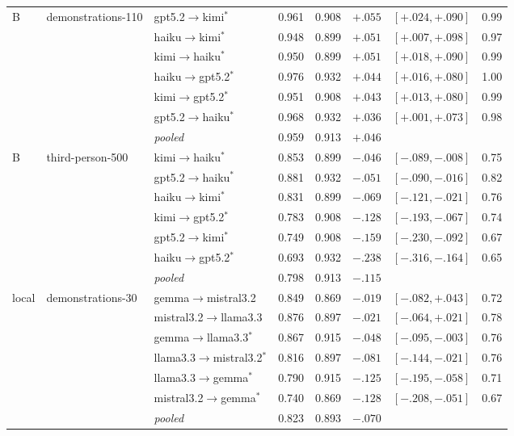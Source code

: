 {\begin{longtable}{lllrlrrr}
\addlinespace
B & demonstrations-110 & gpt5.2$\to$kimi$^{*}$ & 0.961 & 0.908 & $+.055$ & $[+.024,+.090]$ & 0.99 \\*
 &  & haiku$\to$kimi$^{*}$ & 0.948 & 0.899 & $+.051$ & $[+.007,+.098]$ & 0.97 \\*
 &  & kimi$\to$haiku$^{*}$ & 0.950 & 0.899 & $+.051$ & $[+.018,+.090]$ & 0.99 \\*
 &  & haiku$\to$gpt5.2$^{*}$ & 0.976 & 0.932 & $+.044$ & $[+.016,+.080]$ & 1.00 \\*
 &  & kimi$\to$gpt5.2$^{*}$ & 0.951 & 0.908 & $+.043$ & $[+.013,+.080]$ & 0.99 \\*
 &  & gpt5.2$\to$haiku$^{*}$ & 0.968 & 0.932 & $+.036$ & $[+.001,+.073]$ & 0.98 \\*
 & & \emph{pooled} & 0.959 & 0.913 & $+.046$ & & \\
\addlinespace
B & third-person-500 & kimi$\to$haiku$^{*}$ & 0.853 & 0.899 & $-.046$ & $[-.089,-.008]$ & 0.75 \\*
 &  & gpt5.2$\to$haiku$^{*}$ & 0.881 & 0.932 & $-.051$ & $[-.090,-.016]$ & 0.82 \\*
 &  & haiku$\to$kimi$^{*}$ & 0.831 & 0.899 & $-.069$ & $[-.121,-.021]$ & 0.76 \\*
 &  & kimi$\to$gpt5.2$^{*}$ & 0.783 & 0.908 & $-.128$ & $[-.193,-.067]$ & 0.74 \\*
 &  & gpt5.2$\to$kimi$^{*}$ & 0.749 & 0.908 & $-.159$ & $[-.230,-.092]$ & 0.67 \\*
 &  & haiku$\to$gpt5.2$^{*}$ & 0.693 & 0.932 & $-.238$ & $[-.316,-.164]$ & 0.65 \\*
 & & \emph{pooled} & 0.798 & 0.913 & $-.115$ & & \\
\addlinespace
local & demonstrations-30 & gemma$\to$mistral3.2 & 0.849 & 0.869 & $-.019$ & $[-.082,+.043]$ & 0.72 \\*
 &  & mistral3.2$\to$llama3.3 & 0.876 & 0.897 & $-.021$ & $[-.064,+.021]$ & 0.78 \\*
 &  & gemma$\to$llama3.3$^{*}$ & 0.867 & 0.915 & $-.048$ & $[-.095,-.003]$ & 0.76 \\*
 &  & llama3.3$\to$mistral3.2$^{*}$ & 0.816 & 0.897 & $-.081$ & $[-.144,-.021]$ & 0.76 \\*
 &  & llama3.3$\to$gemma$^{*}$ & 0.790 & 0.915 & $-.125$ & $[-.195,-.058]$ & 0.71 \\*
 &  & mistral3.2$\to$gemma$^{*}$ & 0.740 & 0.869 & $-.128$ & $[-.208,-.051]$ & 0.67 \\*
 & & \emph{pooled} & 0.823 & 0.893 & $-.070$ & & \\

\end{longtable}}
